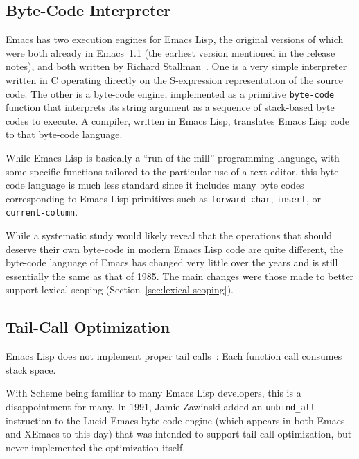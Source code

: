\documentclass[format=acmsmall,screen]{acmart}
\newcommand \Elisp {Emacs Lisp}
\begin{document}
\subsection{Byte-Code Interpreter}
\label{sec:byte-code-interpreter}

Emacs has two execution engines for \Elisp, the original versions of
which were both already in Emacs~1.1 (the earliest version mentioned in the
release notes), and both written by Richard
Stallman~\cite{RMS-compiler}.  One is a very simple interpreter written in C
operating directly on the S-expression representation of the source code.
The other is a byte-code engine, implemented as a primitive
\texttt{byte-code} function that interprets its string
argument as a sequence of stack-based byte codes to execute.  
A compiler, written in \Elisp{}, translates \Elisp{} code to that
byte-code language.

While \Elisp{} is basically a ``run of the mill'' programming language,
with some specific functions tailored to the particular use of a text
editor, this byte-code language is much less standard since it includes many
byte codes corresponding to \Elisp{} primitives such as
\texttt{forward-char}, \texttt{insert}, or \texttt{current-column}.

While a systematic study would likely reveal that the operations that should
deserve their own byte-code in modern \Elisp{} code are quite different, the
byte-code language of Emacs has changed very little over the years and is
still essentially the same as that of 1985.  The main changes were
those made to better support lexical scoping (Section~\ref{sec:lexical-scoping}).

\subsection{Tail-Call Optimization}
\label{sec:tco}

\Elisp{} does not implement proper tail calls~\cite{Clinger1998}: Each
function call consumes stack space.

With Scheme being familiar to
many \Elisp{} developers, this is a disappointment for many.
In 1991, Jamie Zawinski added an \texttt{unbind\_all} instruction to
the Lucid Emacs byte-code engine (which appears in both Emacs and
XEmacs to this day) that was intended to support tail-call optimization,
but never implemented the optimization itself.
\end{document}
